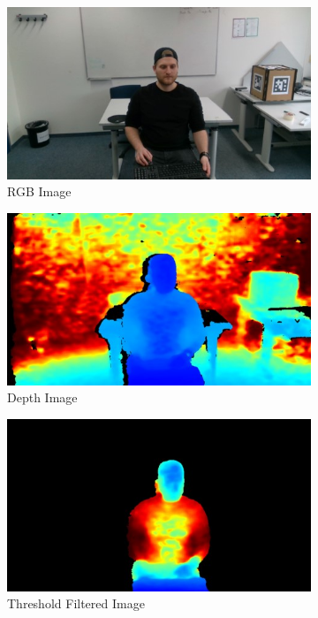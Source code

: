 \documentclass[10pt,twocolumn,letterpaper]{article}
\begin{document}
\begin{figure}
  \centering
  \begin{subfigure}[t]{.315\linewidth}
    \centering\includegraphics[width=0.9\linewidth]{imgs/rgb}
    \caption{RGB Image}
    \label{fig:rgb}
  \end{subfigure}
  \begin{subfigure}[t]{.315\linewidth}
    \centering\includegraphics[width=0.9\linewidth]{imgs/depth}
    \caption{Depth Image}
    \label{fig:depth}
  \end{subfigure}
  \begin{subfigure}[t]{.315\linewidth}
    \centering\includegraphics[width=0.9\linewidth]{imgs/threshold}
    \caption{Threshold Filtered Image}
    \label{fig:threshold}
  \end{subfigure}  
  \caption{ }
\end{figure}
\end{document}
